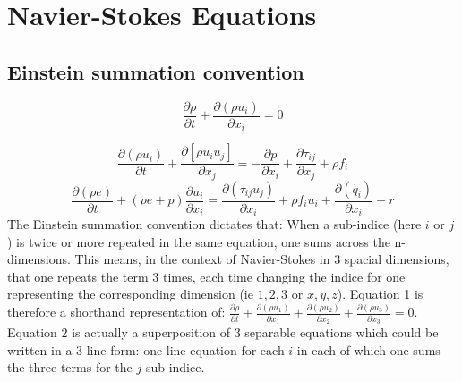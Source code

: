 \documentclass[12pt]{article}
\begin{document}
\maketitle						%

\section{Navier-Stokes Equations}

\subsection{Einstein summation convention}

\begin{equation}
\frac{\partial \rho}{\partial t} + \frac{\partial(\rho u_{i})}{\partial x_{i}} = 0
\end{equation}

\begin{equation}
\frac{\partial (\rho u_{i})}{\partial t} + \frac{\partial[\rho u_{i}u_{j}]}{\partial x_{j}} = -\frac{\partial p}{\partial x_{i}} + \frac{\partial \tau_{ij}}{\partial x_{j}} + \rho f_{i} \end{equation}
\begin{equation}
\frac{\partial (\rho e)}{\partial t} + (\rho e+p)\frac{\partial u_{i}}{\partial x_{i}} = \frac{\partial(\tau_{ij}u_{j})}{\partial x_{i}} + \rho f_{i}u_{i} + \frac{\partial(\dot{ q_{i}})}{\partial x_{i}} + r \end{equation}
The Einstein summation convention dictates that: When a sub-indice (here $i$ or $j$) is twice or more repeated in the same equation, one sums across the n-dimensions. 
This means, in the context of Navier-Stokes in 3 spacial dimensions, that one repeats the term 3 times, each time changing the indice for one representing the corresponding dimension (ie $1,2,3$ or $x,y,z$). Equation 1 is therefore a shorthand representation of: $\frac{\partial \rho}{\partial t}+\frac{\partial(\rho u_{1})}{\partial x_{1}}+\frac{\partial(\rho u_{2})}{\partial x_{2}}+ \frac{\partial(\rho u_{3})}{\partial x_{3}}=0$.
Equation $2$ is actually a superposition of 3 separable equations which could be written in a 3-line form: one line equation for each $i$ in each of which one sums the three terms for the $j$ sub-indice.
\end{document}
